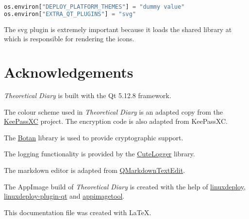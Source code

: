 \documentclass[a4paper, final, oneside, extrafontsizes]{memoir}
\newcommand{\appname}[0]{\textit{Theoretical Diary}}
\begin{document}
\begin{lstlisting}[language=python]
os.environ["DEPLOY_PLATFORM_THEMES"] = "dummy value"
os.environ["EXTRA_QT_PLUGINS"] = "svg"
\end{lstlisting}
The svg plugin is extremely important because it loads the shared library at
which is responsible for rendering the icons.

\chapter{Acknowledgements}

\appname{} is built with the Qt 5.12.8 framework.

The colour scheme used in \appname{} is an adapted copy from the
\href{https://github.com/keepassxreboot/keepassxc}{KeePassXC} project. The
encryption code is also adapted from KeePassXC.

The \href{https://github.com/randombit/botan}{Botan} library is used to provide
cryptographic support.

The logging functionality is provided by the
\href{https://github.com/dept2/CuteLogger}{CuteLogger} library.

The markdown editor is adapted from
\href{https://github.com/pbek/qmarkdowntextedit}{QMarkdownTextEdit}.

The AppImage build of \appname{} is created with the help of
\href{https://github.com/linuxdeploy/linuxdeploy}{linuxdeploy},
\href{https://github.com/linuxdeploy/linuxdeploy-plugin-qt}{linuxdeploy-plugin-qt}
and \href{https://github.com/AppImage/AppImageKit}{appimagetool}.

This documentation file was created with \LaTeX.
\end{document}
